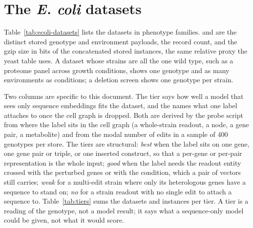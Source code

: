 
\section{The \emph{E. coli} datasets}\label{sec:datasets}

Table~\ref{tab:ecoli-datasets} lists the \ecoliDatasetCount{} datasets in
\ecoliSectionCount{} phenotype families.  and  are the
distinct stored genotype and environment payloads,  the record count,
and  the gzip size in bits of the concatenated stored instances, the same
relative proxy the yeast table uses. A dataset whose strains are all the one wild type,
such as a proteome panel across growth conditions, shows one genotype and as many
environments as conditions; a deletion screen shows one genotype per strain.

Two columns are specific to this document. The  tier says how
well a model that sees only sequence embeddings fits the dataset, and the  names what one label attaches to once the cell graph is dropped. Both are derived
by the probe script from where the label sits in the cell graph (a whole-strain readout,
a node, a gene pair, a metabolite) and from the modal number of edits in a sample of
400 genotypes per store. The tiers are structural: \emph{best} when the label sits on
one gene, one gene pair or triple, or one inserted construct, so that a per-gene or
per-pair representation is the whole input; \emph{good} when the label needs the readout
entity crossed with the perturbed genes or with the condition, which a pair of vectors
still carries; \emph{weak} for a multi-edit strain where only its heterologous genes have
a sequence to stand on; \emph{no} for a strain readout with no single edit to attach a
sequence to. Table~\ref{tab:tiers} sums the datasets and instances per tier. A tier is a
reading of the genotype, not a model result; it says what a sequence-only model could
be given, not what it would score.



\clearpage

